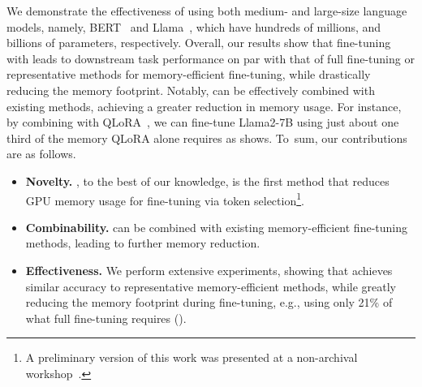 We demonstrate the effectiveness of \method using both medium- and large-size language models, namely, BERT~\citep{devlin_19} and Llama~\citep{touvron_23}, 
which have hundreds of millions, and billions of parameters, respectively.
Overall, our results show that fine-tuning with \method leads to downstream task performance on par with that of full fine-tuning or representative methods for memory-efficient fine-tuning,
while drastically reducing the memory footprint.
Notably, \method can be effectively combined with existing methods, achieving a greater reduction in memory usage.
For instance, by combining \method with QLoRA~\citep{dettmers_23}, 
we can fine-tune Llama2-7B using just about one third of the memory QLoRA alone requires as  shows.
To~sum, our contributions are as follows.
\begin{itemize}[leftmargin=1em,topsep=-2pt,itemsep=-3pt]
	\item \textbf{Novelty.} \method, to the best of our knowledge, is the first method that reduces GPU memory usage for fine-tuning via token selection\footnote{A preliminary version of this work was presented at a non-archival workshop~\citep{simoulin2023memoryefficient}.}.
	\item \textbf{Combinability.} \method can be combined with existing memory-efficient fine-tuning methods, leading to further memory reduction.
	\item \textbf{Effectiveness.} We perform extensive experiments, showing that 
	\method achieves similar accuracy to representative memory-efficient methods,
	while greatly reducing the memory footprint during fine-tuning,
	e.g., using only 21\% of what full fine-tuning requires ().
\end{itemize}










